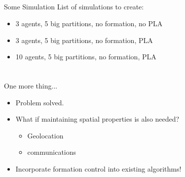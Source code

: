 \documentclass[t]{beamer}
\begin{document}
\subsection[Simulations]{}
\begin{frame}[label=sl3]{Some Simulation}
List of simulations to create:
\begin{itemize}
\item 3 agents, 5 big partitions, no formation, no PLA
\item 3 agents, 5 big partitions, no formation, PLA
\item 10 agents, 5 big partitions, no formation, PLA
\end{itemize}
\end{frame}


\section[Formation Control and PLA]{}
\begin{frame}[label=onemorething]{One more thing...}
\begin{itemize}
\item<1-> Problem solved.
\item<2-> What if maintaining spatial properties is also needed? \begin{itemize}
	\item<2-> Geolocation
	\item<2-> communications
\end{itemize}
\item<3-> Incorporate formation control into existing algorithms!
\end{itemize}
\end{frame}

\end{document}
